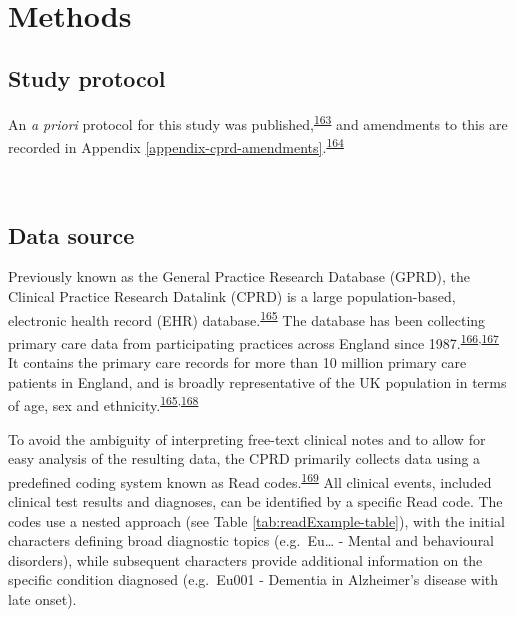\documentclass[a4paper, twoside]{templates/ociamthesis}
\begin{document}
~

\hypertarget{methods-1}{%
\section{Methods}\label{methods-1}}

\hypertarget{study-protocol}{%
\subsection{Study protocol}\label{study-protocol}}

An \emph{a priori} protocol for this study was published,\textsuperscript{\protect\hyperlink{ref-walker2016}{163}} and amendments to this are recorded in Appendix \ref{appendix-cprd-amendments}.\textsuperscript{\protect\hyperlink{ref-vonelm2008}{164}}

~

\hypertarget{cprd-data-source}{%
\subsection{Data source}\label{cprd-data-source}}

Previously known as the General Practice Research Database (GPRD), the Clinical Practice Research Datalink (CPRD) is a large population-based, electronic health record (EHR) database.\textsuperscript{\protect\hyperlink{ref-herrett2015}{165}} The database has been collecting primary care data from participating practices across England since 1987.\textsuperscript{\protect\hyperlink{ref-williams2012}{166},\protect\hyperlink{ref-wood2001revitalizing}{167}} It contains the primary care records for more than 10 million primary care patients in England, and is broadly representative of the UK population in terms of age, sex and ethnicity.\textsuperscript{\protect\hyperlink{ref-herrett2015}{165},\protect\hyperlink{ref-mathur2014}{168}}

To avoid the ambiguity of interpreting free-text clinical notes and to allow for easy analysis of the resulting data, the CPRD primarily collects data using a predefined coding system known as Read codes.\textsuperscript{\protect\hyperlink{ref-booth1994}{169}} All clinical events, included clinical test results and diagnoses, can be identified by a specific Read code. The codes use a nested approach (see Table \ref{tab:readExample-table}), with the initial characters defining broad diagnostic topics (e.g.~Eu\ldots{} - Mental and behavioural disorders), while subsequent characters provide additional information on the specific condition diagnosed (e.g.~Eu001 - Dementia in Alzheimer's disease with late onset).
\end{document}

